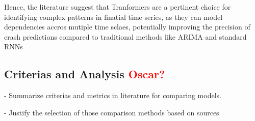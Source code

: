 \documentclass[12pt, letterpaper]{article}
\begin{document}
Hence, the literature suggest that Tranformers are a pertinent choice for identifying complex patterns in finatial time series, as they can model dependencies accros mutiple time sclaes, potentially improving the precision of crash predictions compared to traditional methods like ARIMA and standard RNNs



\subsection*{Criterias and Analysis \textcolor{red}{Oscar?}}
- Summarize criterias and metrics in literature for comparing models.

- Justify the selection of those comparison methods based on sources

\pagebreak
\printbibliography

\end{document}
